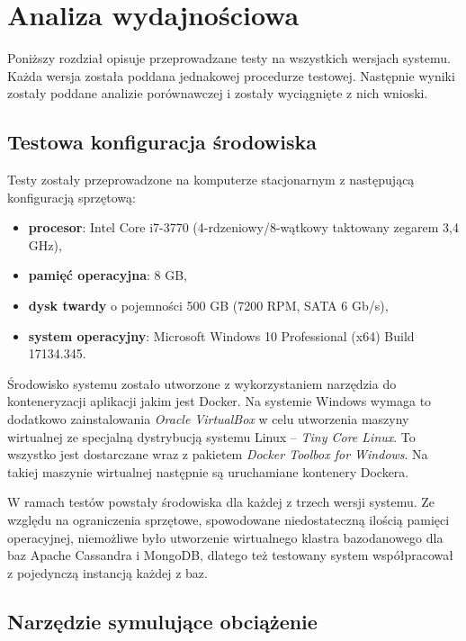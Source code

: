 \chapter{Analiza wydajnościowa}

Poniższy rozdział opisuje przeprowadzane testy na wszystkich wersjach systemu.
Każda wersja została poddana jednakowej procedurze testowej.
Następnie wyniki zostały poddane analizie porównawczej i zostały wyciągnięte z nich wnioski.

\section{Testowa konfiguracja środowiska}

Testy zostały przeprowadzone na komputerze stacjonarnym z następującą konfiguracją sprzętową:
\begin{itemize}
    \item \textbf{procesor}: Intel Core i7-3770 (4-rdzeniowy/8-wątkowy taktowany zegarem 3,4 GHz),
    \item \textbf{pamięć operacyjna}: 8 GB,
    \item \textbf{dysk twardy} o pojemności 500 GB (7200 RPM, SATA 6 Gb/s),
    \item \textbf{system operacyjny}: Microsoft Windows 10 Professional (x64) Build 17134.345.
\end{itemize}

Środowisko systemu zostało utworzone z wykorzystaniem narzędzia do konteneryzacji aplikacji jakim jest Docker.
Na systemie Windows wymaga to dodatkowo zainstalowania \textit{Oracle VirtualBox} w celu utworzenia maszyny wirtualnej ze specjalną dystrybucją systemu Linux -- \textit{Tiny Core Linux}.
To wszystko jest dostarczane wraz z pakietem \textit{Docker Toolbox for Windows}.
Na takiej maszynie wirtualnej następnie są uruchamiane kontenery Dockera.

W ramach testów powstały środowiska dla każdej z trzech wersji systemu.
Ze względu na ograniczenia sprzętowe, spowodowane niedostateczną ilością pamięci operacyjnej, niemożliwe było utworzenie wirtualnego klastra bazodanowego dla baz Apache Cassandra i MongoDB, dlatego też testowany system współpracował z pojedynczą instancją każdej z baz.

\section{Narzędzie symulujące obciążenie}

